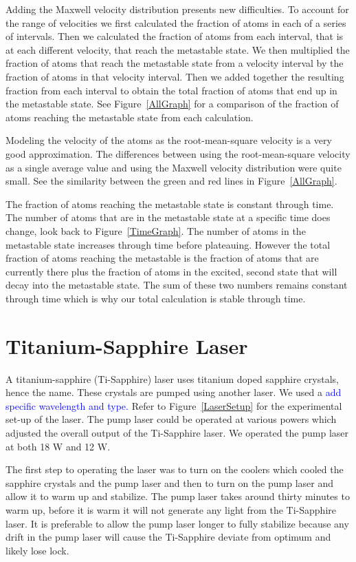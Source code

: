 \documentclass[prb,preprint]{revtex4-1}
\begin{document}
Adding the Maxwell velocity distribution presents new difficulties. To account for the range of velocities we first calculated the fraction of atoms in each of a series of intervals. Then we calculated the fraction of atoms from each interval, that is at each different velocity, that reach the metastable state. We then multiplied the fraction of atoms that reach the metastable state from a velocity interval by the fraction of atoms in that velocity interval. Then we added together the resulting fraction from each interval to obtain the total fraction of atoms that end up in the metastable state. See Figure~\ref{AllGraph} for a comparison of the fraction of atoms reaching the metastable state from each calculation.

Modeling the velocity of the atoms as the root-mean-square velocity is a very good approximation. The differences between using the root-mean-square velocity as a single average value and using the Maxwell velocity distribution were quite small. See the similarity between the green and red lines in Figure~\ref{AllGraph}.

The fraction of atoms reaching the metastable state is constant through time. The number of atoms that are in the metastable state at a specific time does change, look back to Figure~\ref{TimeGraph}. The number of atoms in the metastable state increases through time before plateauing. However the total fraction of atoms reaching the metastable is the fraction of atoms that are currently there plus the fraction of atoms in the excited, second state that will decay into the metastable state. The sum of these two numbers remains constant through time which is why our total calculation is stable through time.

 

\section{Titanium-Sapphire Laser}

A titanium-sapphire (Ti-Sapphire) laser uses titanium doped sapphire crystals, hence the name. These crystals are pumped using another laser. We used a \textcolor{blue}{add specific wavelength and type.} Refer to Figure~\ref{LaserSetup} for the experimental set-up of the laser. The pump laser could be operated at various powers which adjusted the overall output of the Ti-Sapphire laser. We operated the pump laser at both 18 W and 12 W.

The first step to operating the laser was to turn on the coolers which cooled the sapphire crystals and the pump laser and then to turn on the pump laser and allow it to warm up and stabilize. The pump laser takes around thirty minutes to warm up, before it is warm it will not generate any light from the Ti-Sapphire laser. It is preferable to allow the pump laser longer to fully stabilize because any drift in the pump laser will cause the Ti-Sapphire deviate from optimum and likely lose lock.
\end{document}
